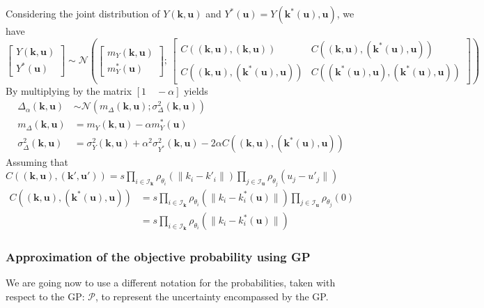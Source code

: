 \documentclass[a4paper,11pt]{article}
\newcommand{\ProbGP}{\mathcal{P}}
\begin{document}
Considering the joint distribution of $Y(\mathbf{k},\mathbf{u})$ and $Y^*(\mathbf{u}) = Y(\mathbf{k}^*(\mathbf{u}), \mathbf{u})$, we have
\begin{equation}
  \begin{bmatrix}
    Y(\mathbf{k},\mathbf{u}) \\
    Y^*(\mathbf{u})
  \end{bmatrix}
  \sim \mathcal{N}\left(
    \begin{bmatrix}
      m_Y(\mathbf{k},\mathbf{u}) \\
      m_Y^*(\mathbf{u})
    \end{bmatrix}
    ;\,
    \begin{bmatrix}
      C\left((\mathbf{k},\mathbf{u}),(\mathbf{k},\mathbf{u})\right) & C\left((\mathbf{k},\mathbf{u}),(\mathbf{k}^*(\mathbf{u}),\mathbf{u})\right) \\
      C\left((\mathbf{k},\mathbf{u}),(\mathbf{k}^*(\mathbf{u}),\mathbf{u})\right) & C\left((\mathbf{k}^*(\mathbf{u}),\mathbf{u}),(\mathbf{k}^*(\mathbf{u}),\mathbf{u})\right)
    \end{bmatrix}
\right)
\end{equation}
By multiplying by the matrix $\left[1\quad -\alpha\right]$ yields
\begin{align}
  \Delta_{\alpha}(\mathbf{k},\mathbf{u}) &\sim \mathcal{N}\left(m_{\Delta}(\mathbf{k},\mathbf{u}); \sigma^2_{\Delta}(\mathbf{k},\mathbf{u})\right) \\
  m_{\Delta}(\mathbf{k},\mathbf{u}) &= m_Y(\mathbf{k},\mathbf{u}) - \alpha m_Y^*(\mathbf{u}) \\
  \sigma^2_{\Delta}(\mathbf{k},\mathbf{u}) &= \sigma_Y^2(\mathbf{k},\mathbf{u}) + \alpha^2 \sigma_{Y^*}^2(\mathbf{k},\mathbf{u}) - 2\alpha C\left((\mathbf{k},\mathbf{u}),(\mathbf{k}^*(\mathbf{u}),\mathbf{u})\right)
\end{align}
Assuming that $C((\mathbf{k},\mathbf{u}), (\mathbf{k}',\mathbf{u}')) = s \prod_{i\in\mathcal{I}_{\mathbf{k}}}\rho_{\theta_i}(\|k_i - k'_i\|) \prod_{j\in\mathcal{I}_{\mathbf{u}}} \rho_{\theta_j}(u_j - u'_j\|)$
\begin{align}
  C\left((\mathbf{k},\mathbf{u}),(\mathbf{k}^*(\mathbf{u}),\mathbf{u})\right) &= s \prod_{i\in\mathcal{I}_{\mathbf{k}}}\rho_{\theta_i}(\|k_i - k^*_i(\mathbf{u})\|)\prod_{j\in\mathcal{I}_{\mathbf{u}}} \rho_{\theta_j}(0) \\
  &=s \prod_{i\in\mathcal{I}_{\mathbf{k}}}\rho_{\theta_i}(\|k_i - k^*_i(\mathbf{u})\|)
\end{align}
\subsubsection{Approximation of the objective probability using GP}
We are going now to use a different notation for the probabilities, taken with respect to the GP: $\ProbGP$, to represent the uncertainty encompassed by the GP.
\end{document}

